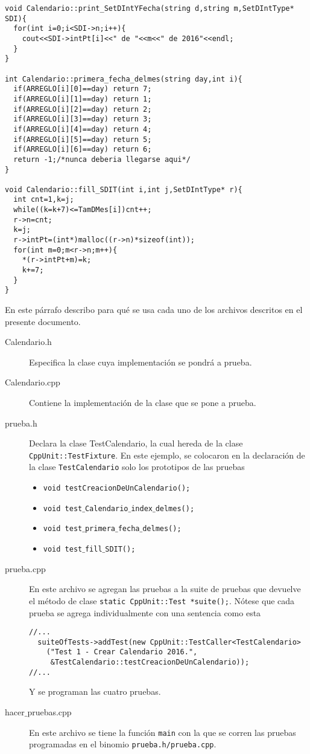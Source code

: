 \documentclass{article}
\begin{document}
\begin{verbatim}
void Calendario::print_SetDIntYFecha(string d,string m,SetDIntType* SDI){
  for(int i=0;i<SDI->n;i++){
    cout<<SDI->intPt[i]<<" de "<<m<<" de 2016"<<endl;
  }
}

int Calendario::primera_fecha_delmes(string day,int i){
  if(ARREGLO[i][0]==day) return 7;
  if(ARREGLO[i][1]==day) return 1;
  if(ARREGLO[i][2]==day) return 2;
  if(ARREGLO[i][3]==day) return 3;
  if(ARREGLO[i][4]==day) return 4;
  if(ARREGLO[i][5]==day) return 5;
  if(ARREGLO[i][6]==day) return 6;
  return -1;/*nunca deberia llegarse aqui*/
}

void Calendario::fill_SDIT(int i,int j,SetDIntType* r){
  int cnt=1,k=j;
  while((k=k+7)<=TamDMes[i])cnt++;
  r->n=cnt;
  k=j;
  r->intPt=(int*)malloc((r->n)*sizeof(int));
  for(int m=0;m<r->n;m++){
    *(r->intPt+m)=k;
    k+=7;
  }
}
\end{verbatim}
En este p\'arrafo describo para qu\'e se usa cada uno de los archivos descritos 
en el presente documento.
\begin{description}
\item[Calendario.h] Especifica la clase cuya implementaci\'on se pondr\'a a prueba.
\item[Calendario.cpp] Contiene la implementaci\'on de la clase que se pone a prueba.
\item[prueba.h] Declara la clase TestCalendario, la cual hereda de la clase 
{\tt CppUnit::TestFixture}. En este ejemplo, se colocaron en la declaraci\'on de la 
clase {\tt TestCalendario} solo los prototipos de las pruebas
\begin{itemize}
\item {\tt void testCreacionDeUnCalendario();}
\item {\tt void test$\_$Calendario$\_$index$\_$delmes();}
\item {\tt void test$\_$primera$\_$fecha$\_$delmes();}
\item {\tt void test$\_$fill$\_$SDIT();}
\end{itemize}
\item[prueba.cpp] En este archivo se agregan las pruebas a la suite de pruebas que 
devuelve el m\'etodo de clase {\tt static CppUnit::Test *suite();}. N\'otese que cada 
prueba se agrega individualmente con una sentencia como esta
\begin{verbatim}
//...
  suiteOfTests->addTest(new CppUnit::TestCaller<TestCalendario>
    ("Test 1 - Crear Calendario 2016.", 
     &TestCalendario::testCreacionDeUnCalendario));
//...
\end{verbatim}
Y se programan las cuatro pruebas.
\item[hacer$\_$pruebas.cpp] En este archivo se tiene la funci\'on {\tt main} con la que 
se corren las pruebas programadas en el binomio {\tt prueba.h/prueba.cpp}.
\end{description}
\end{document}
